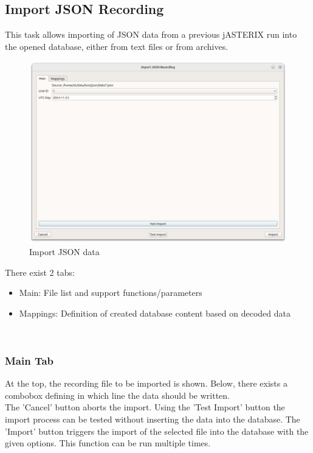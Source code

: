 \subsection{Import JSON Recording}
\label{sec:ui_import_json}

This task allows importing of JSON data from a previous jASTERIX run into the opened database, either from text files or from archives. \\

\begin{figure}[H]
  \hspace*{-0.5cm}
    \includegraphics[width=17cm]{figures/import_json_data.png}
  \caption{Import JSON data}
\end{figure}

There exist 2 tabs:

\begin{itemize}  
\item Main: File list and support functions/parameters
\item Mappings: Definition of created database content based on decoded data
\end{itemize}
\ \\

\subsubsection{Main Tab}

At the top, the recording file to be imported is shown. Below, there exists a combobox defining in which line the data should be written. \\

The 'Cancel' button aborts the import. Using the 'Test Import' button the import process can be tested without inserting the data into the database. 
The 'Import' button triggers the import of the selected file into the database with the given options. This function can be run multiple times. \\

